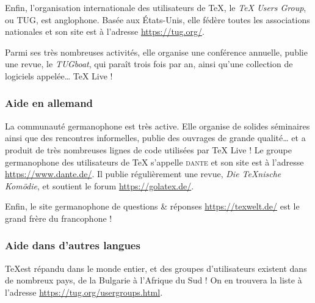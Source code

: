 \documentclass[german, english, french, 12pt]{article}
\renewcommand{\TL}{\TeX{} Live\xspace}%
\newcommand\eng[1]{\foreignlanguage{english}{\emph{#1}}}
\begin{document}
Enfin, l'organisation internationale des utilisateurs de \TeX, le \eng{\TeX{}
  Users Group}, ou TUG, est anglophone. Basée aux États-Unis, elle fédère toutes
les associations nationales et son site est à l'adresse \url{https://tug.org/}.

Parmi ses très nombreuses activités, elle organise une conférence annuelle,
publie une revue, le \emph{TUGboat}, qui paraît trois fois par an, ainsi qu'une
collection de logiciels appelée\dots{} \TL{} !

\subsubsection{Aide en allemand}
La communauté germanophone est très active. Elle organise de solides séminaires
ainsi que des rencontres informelles, publie des ouvrages de grande
qualité\dots{} et a produit de très nombreuses lignes de code utilisées par
\TL{} ! Le groupe germanophone des utilisateurs de \TeX{} s'appelle
\textsc{dante} et son site est à l'adresse \url{https://www.dante.de/}. Il publie
régulièrement une revue, \emph{Die TeXnische Komödie}, et soutient le forum
\url{https://golatex.de/}.

Enfin, le site germanophone de questions \& réponses \url{https://texwelt.de/}
est le grand frère du francophone  !

\subsubsection{Aide dans d'autres langues}
\TeX est répandu dans le monde entier, et des groupes d'utilisateurs existent
dans de nombreux pays, de la Bulgarie à l'Afrique du Sud ! On en trouvera la
liste à l'adresse \url{https://tug.org/usergroups.html}.
\end{document}
